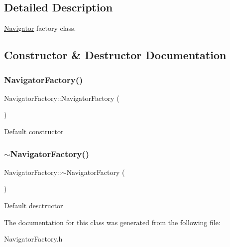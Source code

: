 \subsection{Detailed Description}
\hyperlink{classNavigator}{Navigator} factory class. 

\subsection{Constructor \& Destructor Documentation}
\mbox{\label{classNavigatorFactory_a6dffc936447428b43de6432c3684f43e}} 
\subsubsection{\texorpdfstring{Navigator\+Factory()}{NavigatorFactory()}}
{\footnotesize\ttfamily Navigator\+Factory\+::\+Navigator\+Factory (\begin{DoxyParamCaption}{ }\end{DoxyParamCaption})\hspace{0.3cm}{\ttfamily [inline]}}

Default constructor \mbox{\label{classNavigatorFactory_a761b19635335f0d772196005e443ebd3}} 
\subsubsection{\texorpdfstring{$\sim$\+Navigator\+Factory()}{~NavigatorFactory()}}
{\footnotesize\ttfamily Navigator\+Factory\+::$\sim$\+Navigator\+Factory (\begin{DoxyParamCaption}{ }\end{DoxyParamCaption})\hspace{0.3cm}{\ttfamily [inline]}}

Default desctructor 

The documentation for this class was generated from the following file\+:\begin{DoxyCompactItemize}
\item 
Navigator\+Factory.\+h\end{DoxyCompactItemize}
